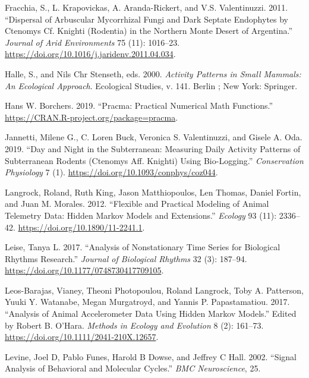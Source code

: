 \documentclass[english,msc,numbers,hidelinks]{coppe}
\newlength{\cslhangindent}
\newenvironment{CSLReferences}[2] %
 {%
  \setlength{\parindent}{0pt}
  \ifodd #1 \everypar{\setlength{\hangindent}{\cslhangindent}}\ignorespaces\fi
  \ifnum #2 > 0
  \setlength{\parskip}{#2\baselineskip}
  \fi
 }%
 {}
\begin{document}
\begin{CSLReferences}{1}{0}
  \leavevmode{}%
  Fracchia, S., L. Krapovickas, A. Aranda-Rickert, and V.S. Valentinuzzi. 2011. {``Dispersal of Arbuscular Mycorrhizal Fungi and Dark Septate Endophytes by Ctenomys Cf. Knighti (Rodentia) in the Northern Monte Desert of Argentina.''} \emph{Journal of Arid Environments} 75 (11): 1016--23. \url{https://doi.org/10.1016/j.jaridenv.2011.04.034}.

  \leavevmode{}%
  Halle, S., and Nils Chr Stenseth, eds. 2000. \emph{Activity Patterns in Small Mammals: An Ecological Approach}. Ecological Studies, v. 141. Berlin ; New York: Springer.

  \leavevmode{}%
  Hans W. Borchers. 2019. {``Pracma: Practical Numerical Math Functions.''} \url{https://CRAN.R-project.org/package=pracma}.

  \leavevmode{}%
  Jannetti, Milene G., C. Loren Buck, Veronica S. Valentinuzzi, and Gisele A. Oda. 2019. {``Day and Night in the Subterranean: Measuring Daily Activity Patterns of Subterranean Rodents (Ctenomys Aff. Knighti) Using Bio-Logging.''} \emph{Conservation Physiology} 7 (1). \url{https://doi.org/10.1093/conphys/coz044}.

  \leavevmode{}%
  Langrock, Roland, Ruth King, Jason Matthiopoulos, Len Thomas, Daniel Fortin, and Juan M. Morales. 2012. {``Flexible and Practical Modeling of Animal Telemetry Data: Hidden Markov Models and Extensions.''} \emph{Ecology} 93 (11): 2336--42. \url{https://doi.org/10.1890/11-2241.1}.

  \leavevmode{}%
  Leise, Tanya L. 2017. {``Analysis of Nonstationary Time Series for Biological Rhythms Research.''} \emph{Journal of Biological Rhythms} 32 (3): 187--94. \url{https://doi.org/10.1177/0748730417709105}.

  \leavevmode{}%
  Leos-Barajas, Vianey, Theoni Photopoulou, Roland Langrock, Toby A. Patterson, Yuuki Y. Watanabe, Megan Murgatroyd, and Yannis P. Papastamatiou. 2017. {``Analysis of Animal Accelerometer Data Using Hidden Markov Models.''} Edited by Robert B. O'Hara. \emph{Methods in Ecology and Evolution} 8 (2): 161--73. \url{https://doi.org/10.1111/2041-210X.12657}.

  \leavevmode{}%
  Levine, Joel D, Pablo Funes, Harold B Dowse, and Jeffrey C Hall. 2002. {``Signal Analysis of Behavioral and Molecular Cycles.''} \emph{BMC Neuroscience}, 25.


\end{CSLReferences}
\end{document}
